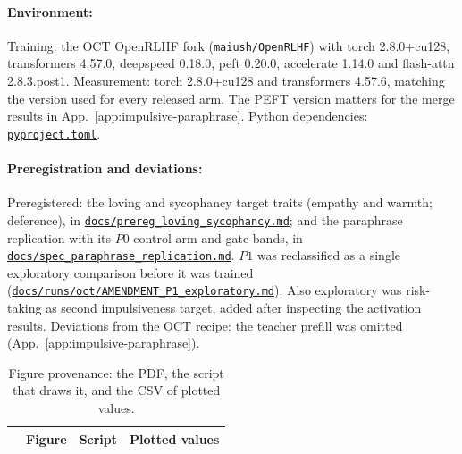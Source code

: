 \documentclass{article}
\newcommand{\provbase}{https://github.com/ukc10014/steering_across_personas/blob/6343a8cee28aaf713b9658b3ab207cb8fb377e51}
\DeclareRobustCommand{\provlink}[1]{\href{\provbase/#1}{\nolinkurl{#1}}}
\newcommand{\provrows}{}
\begin{document}
\paragraph{Environment:}
Training: the OCT OpenRLHF fork (\texttt{maiush/OpenRLHF}) with torch 2.8.0+cu128, transformers 4.57.0, deepspeed 0.18.0, peft 0.20.0, accelerate 1.14.0 and flash-attn 2.8.3.post1. Measurement: torch 2.8.0+cu128 and transformers 4.57.6, matching the version used for every released arm. The PEFT version matters for the merge results in App.~\ref{app:impulsive-paraphrase}. Python dependencies: \provlink{pyproject.toml}.

\paragraph{Preregistration and deviations:}
Preregistered: the loving and sycophancy target traits (empathy and warmth; deference), in \provlink{docs/prereg_loving_sycophancy.md}; and the paraphrase replication with its $P0$ control arm and gate bands, in \provlink{docs/spec_paraphrase_replication.md}. $P1$ was reclassified as a single exploratory comparison before it was trained (\provlink{docs/runs/oct/AMENDMENT_P1_exploratory.md}). Also exploratory was risk-taking as second impulsiveness target, added after inspecting the activation results. Deviations from the OCT recipe: the teacher prefill was omitted (App.~\ref{app:impulsive-paraphrase}).

\begin{table}[t]
\centering
\footnotesize
\caption{Figure provenance: the PDF, the script that draws it, and the CSV of plotted values.}
\label{tab:provenance}
\begin{tabular}{@{}l>{\raggedright\arraybackslash}p{}>{\raggedright\arraybackslash}p{}>{\raggedright\arraybackslash}p{}@{}}
\toprule
& Figure & Script & Plotted values \\
\midrule
\provrows
\bottomrule
\end{tabular}
\end{table}
\end{document}
